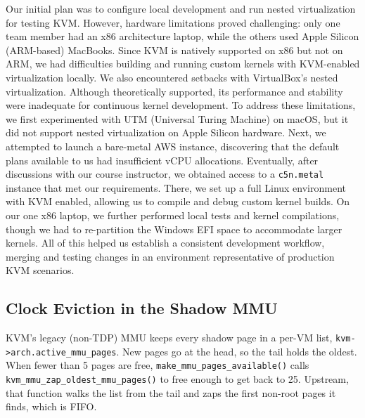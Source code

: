 \documentclass[letterpaper,twocolumn,10pt]{article}
\begin{document}
Our initial plan was to configure local development and run nested virtualization
for testing KVM. However, hardware limitations proved challenging: only one team
member had an x86 architecture laptop, while the others used Apple Silicon
(ARM-based) MacBooks. Since KVM is natively supported on x86 but not on ARM, we had
difficulties building and running custom kernels with KVM-enabled virtualization
locally. We also encountered setbacks with VirtualBox's nested virtualization.
Although theoretically supported, its performance and stability were inadequate
for continuous kernel development. To address these limitations, we first
experimented with UTM (Universal Turing Machine) on macOS, but it did not support
nested virtualization on Apple Silicon hardware. Next, we attempted to launch a
bare-metal AWS instance, discovering that the default plans available to us had
insufficient vCPU allocations. Eventually, after discussions with our course
instructor, we obtained access to a \texttt{c5n.metal} instance that met our
requirements. There, we set up a full Linux environment with KVM enabled, allowing
us to compile and debug custom kernel builds. On our one x86 laptop, we further
performed local tests and kernel compilations, though we had to re-partition the
Windows EFI space to accommodate larger kernels. All of this helped us establish a
consistent development workflow, merging and testing changes in an environment
representative of production KVM scenarios.

\subsection{Clock Eviction in the Shadow MMU}
\label{sec:impl-clock}

KVM's legacy (non-TDP) MMU keeps every shadow page in a per-VM list,
\texttt{kvm->arch.active\_mmu\_pages}. New pages go at the head, so the tail
holds the oldest. When fewer than 5 pages are free,
\texttt{make\_mmu\_pages\_available()} calls
\texttt{kvm\_mmu\_zap\_oldest\_mmu\_pages()} to free enough to get back to 25.
Upstream, that function walks the list from the tail and zaps the first
non-root pages it finds, which is FIFO.
\end{document}

